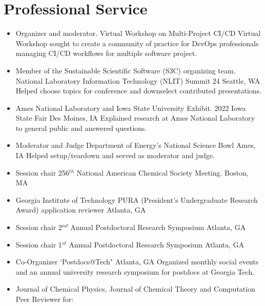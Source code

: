 \documentclass[11pt,a4paper,sans]{moderncv}
\begin{document}
\section{Professional Service}
\vspace{5pt}
\begin{itemize}
	\item{
	      {Organizer and moderator.}
	      {Virtual Workshop on Multi-Project CI/CD}
	      {Virtual}
	      {}
	      {Workshop sought to create a community of practice for DevOps 
		  professionals managing CI/CD workflows for multiple software 
		  project.}}
	\item{
		  {Member of the Sustainable Scientific Software (S3C) organizing team.}  
	      {National Laboratory Information Technology (NLIT) Summit 24}
		  {Seattle, WA}
		  {}
		  {Helped choose topics for conference and downselect contributed 
		  presentations.}}
	\item{
		  {Ames National Laboratory and Iowa State University Exhibit.}
	      {2022 Iowa State Fair}
		  {Des Moines, IA}
		  {}
		  {Explained research at Ames National Laboratory to general public and
		   answered questions.}}
	\item{
          {Moderator and Judge}
          {Department of Energy's National Science Bowl}
          {Ames, IA}
          {}
          {Helped setup/teardown and served as moderator and judge.}}
	\item{
	      {Session chair}
          {256$^{th}$ National American Chemical Society Meeting.}
          {Boston, MA}
          {}
          {}}
	\item{
          {Georgia Institute of Technology}
          {PURA (President's Undergraduate Research Award) application reviewer}
          {Atlanta, GA}
          {}
          {}}
	\item{
	     {Session chair}
         {2$^{nd}$ Annual Postdoctoral Research Symposium}
         {Atlanta, GA}
         {}
         {}}
	\item{
          {Session chair}
          {1$^{st}$ Annual Postdoctoral Research Symposium}
          {Atlanta, GA}
          {}
          {}}
	\item{
        {Co-Organizer}
        {`Postdocs@Tech"}
        {Atlanta, GA}
        {}
        {Organized monthly social events and an annual university research 
		 symposium for postdocs at Georgia Tech.}}
	\item{\cventry{}
          {Journal of Chemical Physics, Journal of Chemical Theory and
          Computation}
          {Peer Reviewer for:}
		  {}
          {}
          {}}
\end{itemize}
\end{document}

